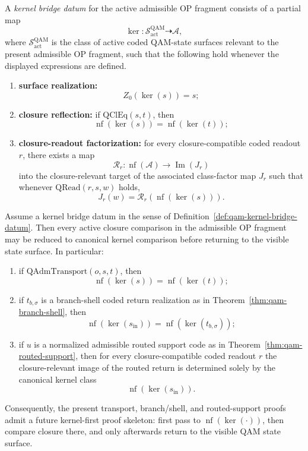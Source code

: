 \begin{definition}\label{def:qam-kernel-bridge-datum}
A \emph{kernel bridge datum} for the active admissible OP fragment consists of a partial map
\[
\operatorname{ker}:\mathcal S^{\mathrm{QAM}}_{\mathrm{act}} \dashrightarrow \mathcal A,
\]
where $\mathcal S^{\mathrm{QAM}}_{\mathrm{act}}$ is the class of active coded QAM-state surfaces relevant to the present admissible OP fragment, such that the following hold whenever the displayed expressions are defined.
\begin{enumerate}
\item \textbf{surface realization:}
\[
Z_0(\operatorname{ker}(s))=s;
\]
\item \textbf{closure reflection:} if $\mathrm{QClEq}(s,t)$, then
\[
\operatorname{nf}(\operatorname{ker}(s))=\operatorname{nf}(\operatorname{ker}(t));
\]
\item \textbf{closure-readout factorization:} for every closure-compatible coded readout $r$, there exists a map
\[
\mathcal R_r: \operatorname{nf}(\mathcal A) \to \operatorname{Im}(J_r)
\]
into the closure-relevant target of the associated class-factor map $J_r$ such that whenever $\mathrm{QRead}(r,s,w)$ holds,
\[
J_r(w)=\mathcal R_r(\operatorname{nf}(\operatorname{ker}(s))).
\]
\end{enumerate}
\end{definition}

\begin{theorem}\label{thm:qam-kernel-bridge}
Assume a kernel bridge datum in the sense of Definition~\ref{def:qam-kernel-bridge-datum}. Then every active closure comparison in the admissible OP fragment may be reduced to canonical kernel comparison before returning to the visible state surface. In particular:
\begin{enumerate}
\item if $\mathrm{QAdmTransport}(o,s,t)$, then
\[
\operatorname{nf}(\operatorname{ker}(s))=\operatorname{nf}(\operatorname{ker}(t));
\]
\item if $t_{b,\sigma}$ is a branch-shell coded return realization as in Theorem~\ref{thm:qam-branch-shell}, then
\[
\operatorname{nf}(\operatorname{ker}(s_{\mathrm{in}}))=\operatorname{nf}(\operatorname{ker}(t_{b,\sigma}));
\]
\item if $u$ is a normalized admissible routed support code as in Theorem~\ref{thm:qam-routed-support}, then for every closure-compatible coded readout $r$ the closure-relevant image of the routed return is determined solely by the canonical kernel class
\[
\operatorname{nf}(\operatorname{ker}(s_{\mathrm{in}})).
\]
\end{enumerate}
Consequently, the present transport, branch/shell, and routed-support proofs admit a future kernel-first proof skeleton: first pass to $\operatorname{nf}(\operatorname{ker}(\cdot))$, then compare closure there, and only afterwards return to the visible QAM state surface.
\end{theorem}

